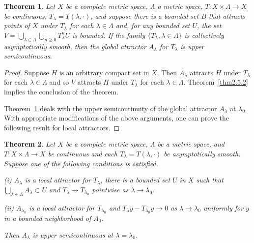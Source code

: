 \documentclass{surv-l}
\theoremstyle{plain}
\newtheorem{theorem}{Theorem}[section]
\theoremstyle{definition}
\numberwithin{equation}{section}
\numberwithin{figure}{chapter}
\begin{document}
\begin{theorem}\label{thm2.5.3} Let $X$ be a complete metric space, $\Lambda$ a metric space,
$T\!:X\times\Lambda\rightarrow X$ be continuous, $T_{\lambda}=T(\lambda, \cdot)$, and suppose there is a bounded set $B$ that attracts points of $X$ under $T_{\lambda}$ for each $\lambda\in\Lambda$ and, for any bounded set $U$, the set $V=\bigcup_{\lambda\in\Lambda}\bigcup_{n\geq 0}T_{\lambda}^{n}U$ is bounded. If the family $\{T_{\lambda}, \lambda\in\Lambda\}$ is collectively asymptotically smooth, then the global attractor $A_{\lambda}$ for $T_{\lambda}$ is upper semicontinuous.
\end{theorem}

\begin{proof} Suppose $H$ is an arbitrary compact set in $X$. Then $A_{\lambda}$ attracts $H$ under $T_{\lambda}$ for each $\lambda\in\Lambda$ and so $V$ attracts $H$ under $T_{\lambda}$ for each $\lambda\in\Lambda$. Theorem~\ref{thm2.5.2} implies the conclusion of the theorem.

Theorem~\ref{thm2.5.3} deals with the upper semicontinuity of the global attractor $A_{\lambda}$ at $\lambda_{0}$. With appropriate modifications of the above arguments, one can prove the following result for local attractors.
\end{proof}

\begin{theorem}\label{thm2.5.4} Let $X$ be a complete metric space, $\Lambda$ be a metric space, and
$T\!:X\times\Lambda\rightarrow X$ be continuous and each $T_{\lambda}=T(\lambda, \cdot)$ be asymptotically smooth. Suppose one of the following conditions is satisfied.

\emph{(i)} $A_{\lambda}$ is a local attractor for $T_{\lambda}$, there is a bounded set $U$ in $X$ such that $\bigcup_{\lambda\in\Lambda}A_{\lambda}\subset U$ and $T_{\lambda}\rightarrow T_{\lambda_{0}}$ pointwise as $\lambda\rightarrow\lambda_{0}$. 

\emph{(ii)} $A_{\lambda_{0}}$ is a local attractor for $T_{\lambda_{0}}$ and $T_{\lambda}y-T_{\lambda_{0}}y\rightarrow 0$ as $\lambda\rightarrow\lambda_{0}$ uniformly for $y$ in a bounded neighborhood of $A_{0}$.

\noindent Then $A_{\lambda}$ is upper semicontinuous at $\lambda=\lambda_{0}$.
\end{theorem}
\end{document}
